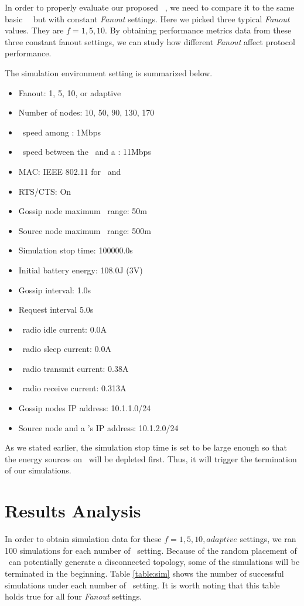 In order to properly evaluate our proposed \pp ~\gp, we need to compare it to the same basic \pp ~\gp ~but with constant \emph{Fanout} settings. Here we picked three typical \emph{Fanout} values. They are $f=1, 5, 10$. By obtaining performance metrics data from these three constant fanout settings, we can study how different \emph{Fanout} affect protocol performance. 

The simulation environment setting is summarized below.

\begin{itemize}
	\item Fanout: 1, 5, 10, or adaptive
	\item Number of nodes: 10, 50, 90, 130, 170
	\item \wf ~speed among \gns: 1Mbps
	\item \wf ~speed between the \sn ~and a \gn: 11Mbps
	\item MAC: IEEE 802.11 for \gns ~and \sn
	\item RTS/CTS: On
	\item Gossip node maximum \wf ~range: 50m
	\item Source node maximum \wf ~range: 500m
	\item Simulation stop time: 100000.0s
	\item Initial battery energy: 108.0J  (3V)
	\item Gossip interval: 1.0s
	\item Request interval 5.0s
	\item \wf ~radio idle current: 0.0A
	\item \wf ~radio sleep current: 0.0A
	\item \wf ~radio transmit current: 0.38A
	\item \wf ~radio receive current: 0.313A
	\item Gossip nodes IP address: 10.1.1.0/24
	\item Source node and a \gn's IP address: 10.1.2.0/24	
\end{itemize}

As we stated earlier, the simulation stop time is set to be large enough so that the energy sources on \gns ~will be depleted first. Thus, it will trigger the termination of our simulations. 

\section{Results Analysis}

In order to obtain simulation data for these $f=1,5,10, adaptive$ settings, we ran 100 simulations for each number of \gns ~setting. Because of the random placement of \gns ~can potentially generate a disconnected topology, some of the simulations will be terminated in the beginning. Table \ref{table:sim} shows the number of successful simulations under each number of \gns ~setting. It is worth noting that this table holds true for all four \emph{Fanout} settings.

